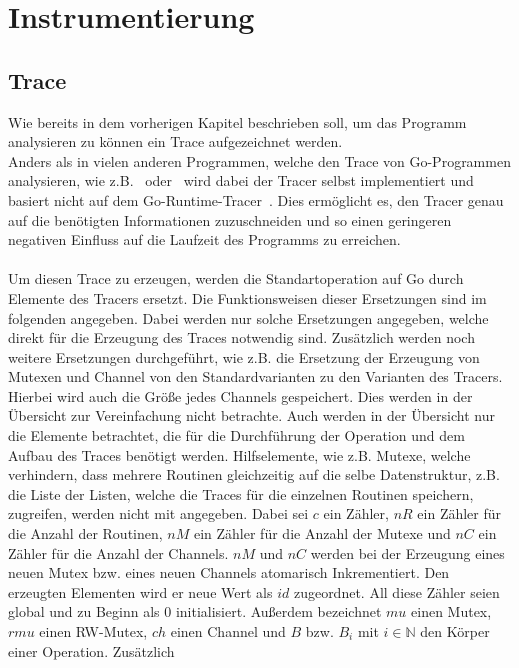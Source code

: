\chapter{Instrumentierung}

\section{Trace}\label{Chap:Instrumenter-Sec:Trace}
Wie bereits in dem vorherigen Kapitel beschrieben soll, um das 
Programm analysieren zu können ein Trace aufgezeichnet werden.\\
Anders als in vielen anderen Programmen, welche den Trace von Go-Programmen
analysieren, wie z.B.~\cite{GoAt2} oder~\cite{GoVis} wird dabei der Tracer 
selbst implementiert und basiert nicht auf dem Go-Runtime-Tracer~\cite{GoRunTrace}. 
Dies ermöglicht es, den Tracer genau auf die benötigten Informationen zuzuschneiden
und so einen geringeren negativen Einfluss auf die Laufzeit des Programms zu erreichen.\\\\
Um diesen Trace zu erzeugen, werden die Standartoperation auf Go durch Elemente
des Tracers ersetzt. Die Funktionsweisen dieser Ersetzungen sind im folgenden 
angegeben. Dabei werden nur solche Ersetzungen angegeben, welche direkt 
für die Erzeugung
des Traces notwendig sind. Zusätzlich werden noch 
weitere Ersetzungen durchgeführt, wie z.B. die Ersetzung der Erzeugung von 
Mutexen und Channel von den Standardvarianten zu den Varianten des Tracers.
Hierbei wird auch die Größe jedes Channels gespeichert.
Dies werden in der Übersicht zur Vereinfachung nicht betrachte. Auch werden 
in der Übersicht nur die Elemente betrachtet, die für die Durchführung der 
Operation und dem Aufbau des Traces benötigt werden. Hilfselemente, wie z.B. 
Mutexe, welche verhindern, dass mehrere Routinen gleichzeitig auf die selbe 
Datenstruktur, 
z.B. die Liste der Listen, welche die Traces für die einzelnen Routinen 
speichern, zugreifen, werden nicht mit angegeben. Dabei sei $c$ ein 
Zähler, $nR$ ein Zähler für die Anzahl der Routinen, $nM$ ein Zähler für die 
Anzahl der Mutexe und $nC$ ein Zähler für die Anzahl der Channels. $nM$ und $nC$
werden bei der Erzeugung eines neuen Mutex bzw. eines neuen Channels atomarisch 
Inkrementiert. Den erzeugten Elementen wird er neue Wert als $id$ zugeordnet. All diese 
Zähler seien global und zu Beginn als $0$ initialisiert. Außerdem bezeichnet 
$mu$ einen Mutex, $rmu$ einen RW-Mutex, $ch$ einen Channel und $B$ bzw. $B_i$
mit $i\in\mathbb{N}$ den 
Körper einer Operation. Zusätzlich
